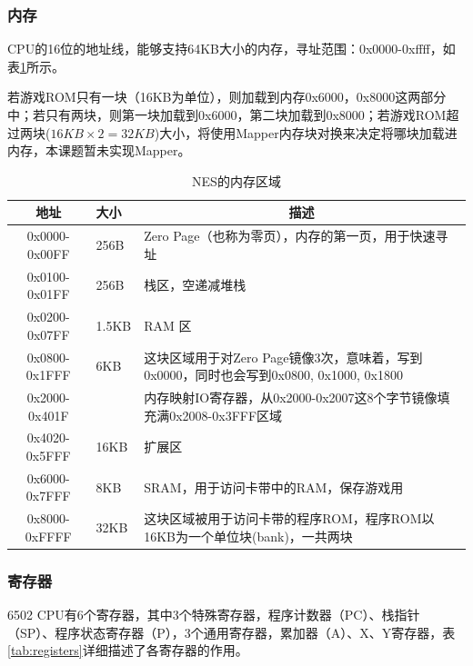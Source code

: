 \documentclass[a4paper]{ltxdoc}
\begin{document}
{\subsubsection{内存}
CPU的16位的地址线，能够支持64KB大小的内存，寻址范围：0x0000-0xffff，如表\ref{tab:memory_map}所示。

若游戏ROM只有一块（16KB为单位），则加载到内存0x6000，0x8000这两部分中；若只有两块，则第一块加载到0x6000，第二块加载到0x8000；若游戏ROM超过两块($16KB\times 2 = 32KB$)大小，将使用Mapper内存块对换来决定将哪块加载进内存，本课题暂未实现Mapper。
\begin{table}[h]
\centering
\caption{NES的内存区域}
\label{tab:memory_map}
\begin{tabularx}{\textwidth}{|c|l|X|}
\hline
\rowcolor[HTML]{8DCDFF}
地址            & 大小                     & \multicolumn{1}{c|}{\cellcolor[HTML]{8DCDFF}描述}                \\ \hline
0x0000-0x00FF & 256B                   & Zero Page（也称为零页），内存的第一页，用于快速寻址                                 \\ \hline
0x0100-0x01FF & 256B                   & 栈区，空递减堆栈                                                             \\ \hline
0x0200-0x07FF & 1.5KB                  & RAM 区                                                          \\ \hline
0x0800-0x1FFF & 6KB                    & 这块区域用于对Zero Page镜像3次，意味着，写到0x0000，同时也会写到0x0800, 0x1000, 0x1800 \\ \hline
0x2000-0x401F &                        & 内存映射IO寄存器，从0x2000-0x2007这8个字节镜像填充满0x2008-0x3FFF区域              \\ \cline{1-1} \cline{3-3}
0x4020-0x5FFF & \multirow{-2}{*}{16KB} & 扩展区                                                            \\ \hline
0x6000-0x7FFF & 8KB                    & SRAM，用于访问卡带中的RAM，保存游戏用                                         \\ \hline
0x8000-0xFFFF & 32KB                   & 这块区域被用于访问卡带的程序ROM，程序ROM以16KB为一个单位块(bank)，一共两块                  \\ \hline
\end{tabularx}
\end{table}

\subsubsection{寄存器}
6502 CPU有6个寄存器，其中3个特殊寄存器，程序计数器（PC）、栈指针（SP）、程序状态寄存器（P），3个通用寄存器，累加器（A）、X、Y寄存器，表\ref{tab:registers}详细描述了各寄存器的作用。

}
\end{document}

